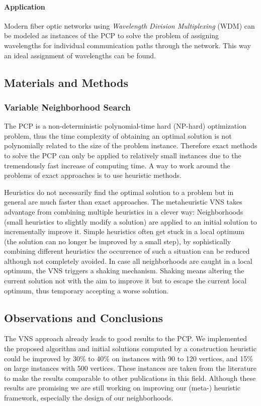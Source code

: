 \documentclass[paper = a4, fontsize = 10pt]{scrartcl}
\begin{document}
\paragraph{Application}
Modern fiber optic networks using \textit{Wavelength Division Multiplexing} (WDM) can be modeled as instances of the PCP to solve the problem of assigning wavelengths for individual communication paths through the network. This way an ideal assignment of wavelengths can be found.

\subsection*{Materials and Methods}

\subsubsection*{Variable Neighborhood Search}
The PCP is a non-deterministic polynomial-time hard (NP-hard) optimization problem, thus the time complexity of obtaining an optimal solution is not polynomially related to the size of the problem instance. Therefore exact methods to solve the PCP can only be applied to relatively small instances due to the tremendously fast increase of computing time. A way to work around the problems of exact approaches is to use heuristic methods.

Heuristics do not necessarily find the optimal solution to a problem but in general are much faster than exact approaches. The metaheuristic VNS takes advantage from combining multiple heuristics in a clever way: Neighborhoods (small heuristics to slightly modify a solution) are applied to an initial solution to incrementally improve it. Simple heuristics often get stuck in a local optimum (the solution can no longer be improved by a small step), by sophistically combining different heuristics the occurrence of such a situation can be reduced although not completely avoided. In case all neighborhoods are caught in a local optimum, the VNS triggers a shaking mechanism. Shaking means altering the current solution not with the aim to improve it but to escape the current local optimum, thus temporary accepting a worse solution.

\subsection*{Observations and Conclusions}

The VNS approach already leads to good results to the PCP. We implemented the proposed algorithm and initial solutions computed by a construction heuristic could be improved by 30\% to 40\% on instances with 90 to 120 vertices, and 15\% on large instances with 500 vertices. These instances are taken from the literature to make the results comparable to other publications in this field. Although these results are promising we are still working on improving our (meta-) heuristic framework, especially the design of our neighborhoods.
\end{document}
